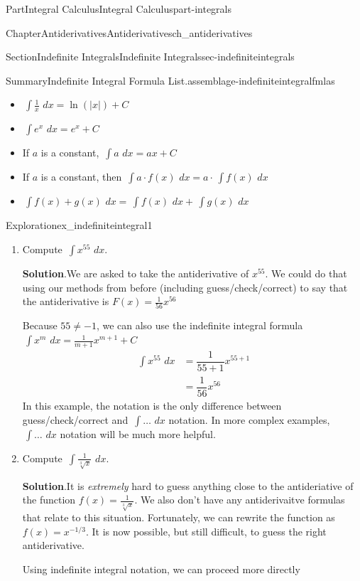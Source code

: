\documentclass{tufte-book}
\newcommand{\blocktitlefont}{\relax}
\numberwithin{equation}{chapter}
\newcommand{\intdx}[1]{{\,\int#1\,\,dx}}
\newcommand{\amp}{&}
\begin{document}
\begin{partptx}{Part}{Integral Calculus}{}{Integral Calculus}{}{}{part-integrals}
\begin{chapterptx}{Chapter}{Antiderivatives}{}{Antiderivatives}{}{}{ch_antiderivatives}
\begin{sectionptx}{Section}{Indefinite Integrals}{}{Indefinite Integrals}{}{}{sec-indefiniteintegrals}
\begin{assemblage}{Summary}{Indefinite Integral Formula List.}{assemblage-indefiniteintegralfmlas}
\begin{itemize}[label=\textbullet]
\item{}\(\displaystyle \intdx{ \frac{1}{x} } = \ln(|x|) + C \)%
\item{}\(\displaystyle \intdx{ e^x } = e^x + C \)%
\item{}If \(a\) is a constant, \(\intdx{a} = ax + C\)%
\item{}If \(a\) is a constant, then \(\intdx{a\cdot f(x)} = a \cdot \intdx{f(x)}\)%
\item{}\(\displaystyle \intdx{f(x) + g(x)} = \intdx{f(x)} + \intdx{g(x)}\)%
\end{itemize}
%
\end{assemblage}
\begin{exploration}{Exploration}{}{ex_indefiniteintegral1}%
\begin{enumerate}[font=\bfseries,label=(\alph*),ref=\alph*]%
\item{}Compute \(\intdx{x^{55}} \).%
\par\smallskip%
\noindent\textbf{\blocktitlefont Solution}.\hypertarget{ex_indefiniteintegral1-1-2}{}\quad{}We are asked to take the antiderivative of \(x^{55}\).  We could do that using our methods from before (including guess\slash{}check\slash{}correct) to say that the antiderivative is \(F(x) = \frac{1}{56}x^{56}\)%
\par
Because \(55\neq -1\), we can also use the indefinite integral formula \(\intdx{x^m} = \frac{1}{m+1}x^{m+1} + C\)%
\begin{align*}
\intdx{ x^{55} } \amp = \dfrac{1}{55+1} x^{55+1} \\
\amp = \dfrac{1}{56} x^{56}
\end{align*}
In this example, the notation is the only difference between guess\slash{}check\slash{}correct and \(\intdx{\dots}\) notation. In more complex examples, \(\intdx{\dots}\) notation will be much more helpful.%
\item{}Compute \(\intdx{\frac{1}{\sqrt[3]{x}}} \).%
\par\smallskip%
\noindent\textbf{\blocktitlefont Solution}.\hypertarget{ex_indefiniteintegral1-2-2}{}\quad{}It is \emph{extremely} hard to guess anything close to the antideriative of the function \(f(x) = \frac{1}{\sqrt[3]{x}}\). We also don't have any antiderivaitve formulas that relate to this situation. Fortunately, we can rewrite the function as \(f(x) = x^{-1/3} \). It is now possible, but still difficult, to guess the right antiderivative.%
\par
Using indefinite integral notation, we can proceed more directly%
\begin{align*}

\end{align*}
\end{enumerate}
\end{exploration}
\end{sectionptx}
\end{chapterptx}
\end{partptx}
\end{document}
